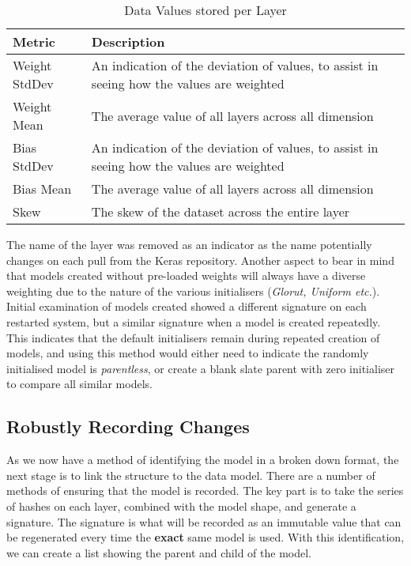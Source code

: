 \begin{table}[!ht]
    \centering
    \caption{Data Values stored per Layer}
    \setlength\tabcolsep{0pt} %
    \begin{tabular}{@{} p{2cm} p{6.5cm}  @{}}
        \hline
        Metric & Description \\
        \hline
        Weight StdDev  & An indication of the deviation of values, to assist in seeing how the values are weighted \\
        Weight Mean    & The average value of all layers across all dimension \\
        Bias StdDev  & An indication of the deviation of values, to assist in seeing how the values are weighted \\
        Bias Mean    & The average value of all layers across all dimension \\
        Skew   & The skew of the dataset across the entire layer \\
        \hline
    \end{tabular}
\end{table}

The name of the layer was removed as an indicator as the name potentially changes on each pull from the Keras repository. Another aspect to bear in mind that models created without pre-loaded weights will always have a diverse weighting due to the nature of the various initialisers (\textit{Glorut, Uniform etc.}). Initial examination of models created showed a different signature on each restarted system, but a similar signature when a model is created repeatedly. This indicates that the default initialisers remain during repeated creation of models, and using this method would either need to indicate the randomly initialised model is \textit{parentless}, or create a blank slate parent with zero initialiser to compare all similar models.

\subsection{Robustly Recording Changes}
As we now have a method of identifying the model in a broken down format, the next stage is to link the structure to the data model. There are a number of methods of ensuring that the model is recorded. The key part is to take the series of hashes on each layer, combined with the model shape, and generate a signature. The signature is what will be recorded as an immutable value that can be regenerated every time the \textbf{exact} same model is used. With this identification, we can create a list showing the parent and child of the model.

